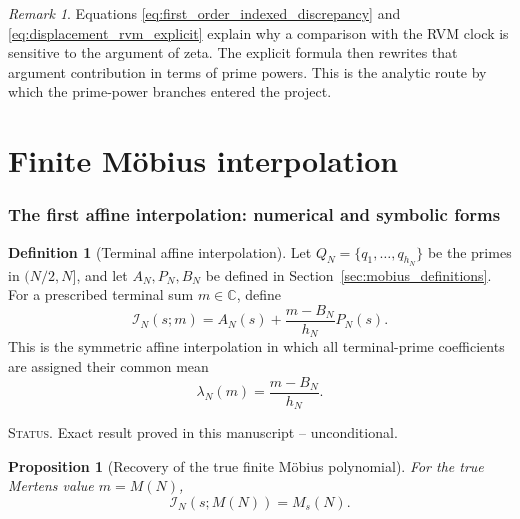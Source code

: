 \documentclass[11pt]{amsart}
\numberwithin{equation}{section}
\theoremstyle{plain}
\newtheorem{proposition}[theorem]{Proposition}
\theoremstyle{definition}
\newtheorem{definition}[theorem]{Definition}
\theoremstyle{remark}
\newtheorem{remark}[theorem]{Remark}
\newcommand{\1}{\mathbf{1}}
\newcommand{\statusnote}[1]{%
  \par\smallskip\noindent
  \begingroup\footnotesize\textsc{Status.} #1\endgroup
  \par\smallskip}
\begin{document}
\begin{remark}
\label{rem:rvm_origin_prime_formula}
Equations \eqref{eq:first_order_indexed_discrepancy} and
\eqref{eq:displacement_rvm_explicit} explain why a comparison with the RVM
clock is sensitive to the argument of zeta.  The explicit formula then
rewrites that argument contribution in terms of prime powers.  This is the
analytic route by which the prime-power branches entered the project.
\end{remark}

\part{Finite Möbius interpolation}


\section{The first affine interpolation: numerical and symbolic forms}
\label{sec:first_affine_interpolation}

\begin{definition}[Terminal affine interpolation]
\label{def:terminal_affine_interpolation}
Let \(Q_N=\{q_1,\ldots,q_{h_N}\}\) be the primes in \((N/2,N]\), and
let \(A_N,P_N,B_N\) be defined in Section~\ref{sec:mobius_definitions}.
For a prescribed terminal sum \(m\in\mathbb C\), define
\begin{equation}
\boxed{
\mathcal I_N(s;m)
=
A_N(s)+\frac{m-B_N}{h_N}P_N(s).
}
\label{eq:terminal_affine_interpolation}
\end{equation}
This is the symmetric affine interpolation in which all terminal-prime
coefficients are assigned their common mean
\begin{equation}
\lambda_N(m)=\frac{m-B_N}{h_N}.
\label{eq:terminal_mean_coefficient}
\end{equation}
\end{definition}

\statusnote{Exact result proved in this manuscript -- unconditional.}
\begin{proposition}[Recovery of the true finite Möbius polynomial]
\label{prop:true_terminal_value}
For the true Mertens value \(m=M(N)\),
\begin{equation}
\mathcal I_N(s;M(N))
=
M_s(N).
\label{eq:true_terminal_interpolation}
\end{equation}
\end{proposition}
\end{document}
